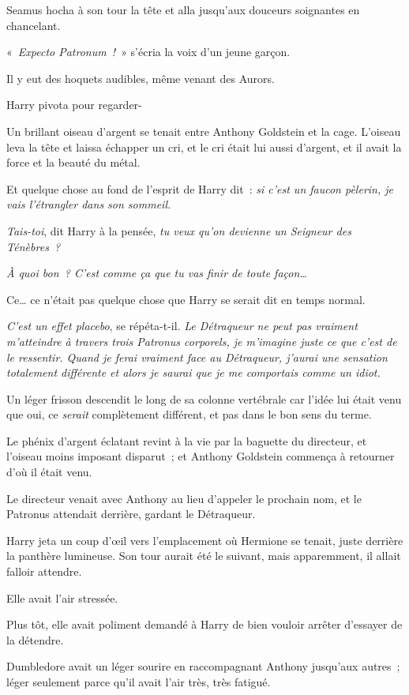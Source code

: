 Seamus hocha à son tour la tête et alla jusqu'aux douceurs soignantes en chancelant.

«~\emph{Expecto Patronum~!}~» s'écria la voix d'un jeune garçon.

Il y eut des hoquets audibles, même venant des Aurors.

Harry pivota pour regarder-

Un brillant oiseau d'argent se tenait entre Anthony Goldstein et la cage. L'oiseau leva la tête et laissa échapper un cri, et le cri était lui aussi d'argent, et il avait la force et la beauté du métal.

Et quelque chose au fond de l'esprit de Harry dit~: \emph{si c'est un faucon pèlerin, je vais l'étrangler dans son sommeil.}

\emph{Tais-toi}, dit Harry à la pensée, \emph{tu veux qu'on devienne un Seigneur des Ténèbres~?}

\emph{À quoi bon~? C'est comme ça que tu vas finir de toute façon…}

Ce… ce n'était pas quelque chose que Harry se serait dit en temps normal.

\emph{C'est un effet placebo}, se répéta-t-il. \emph{Le Détraqueur ne peut pas vraiment m'atteindre à travers trois Patronus corporels, je m'imagine juste ce que c'est de le ressentir. Quand je ferai vraiment face au Détraqueur, j'aurai une sensation totalement différente et alors je saurai que je me comportais comme un idiot.}

Un léger frisson descendit le long de sa colonne vertébrale car l'idée lui était venu que oui, ce \emph{serait} complètement différent, et pas dans le bon sens du terme.

Le phénix d'argent éclatant revint à la vie par la baguette du directeur, et l'oiseau moins imposant disparut~; et Anthony Goldstein commença à retourner d'où il était venu.

Le directeur venait avec Anthony au lieu d'appeler le prochain nom, et le Patronus attendait derrière, gardant le Détraqueur.

Harry jeta un coup d'œil vers l'emplacement où Hermione se tenait, juste derrière la panthère lumineuse. Son tour aurait été le suivant, mais apparemment, il allait falloir attendre.

Elle avait l'air stressée.

Plus tôt, elle avait poliment demandé à Harry de bien vouloir arrêter d'essayer de la détendre.

Dumbledore avait un léger sourire en raccompagnant Anthony jusqu'aux autres~; léger seulement parce qu'il avait l'air très, très fatigué.

